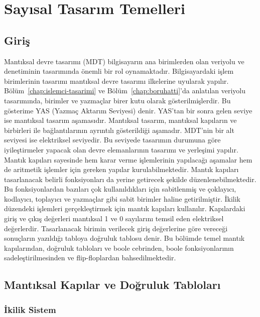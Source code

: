 \chapter{Sayısal Tasarım Temelleri}
\label{ch:sayisal-tasarim}

\section{Giriş}

Mantıksal devre tasarımı (MDT) bilgisayarın ana birimlerden olan veriyolu ve denetiminin tasarımında önemli bir rol oynamaktadır. Bilgisayardaki işlem birimlerinin tasarımı mantıksal devre tasarımı ilkelerine uyularak yapılır. Bölüm~\ref{chap:islemci-tasarimi} ve Bölüm~\ref{chap:boruhatti}'da anlatılan veriyolu tasarımında, birimler ve yazmaçlar birer kutu olarak gösterilmişlerdir. Bu gösterime YAS (Yazmaç Aktarım Seviyesi) denir. YAS'tan bir sonra gelen seviye ise mantıksal tasarım aşamasıdır. Mantıksal tasarım, mantıksal kapıların ve birbirleri ile bağlantılarının ayrıntılı gösterildiği aşamadır. MDT'nin bir alt seviyesi ise elektriksel seviyedir. Bu seviyede tasarımın durumuna göre iyileştirmeler yapacak olan devre elemanlarının tasarımı ve yerleşimi yapılır. Mantık kapıları sayesinde hem karar verme işlemlerinin yapılacağı aşamalar hem de aritmetik işlemler için gereken yapılar kurulabilmektedir. Mantık kapıları tasarlanacak belirli fonksiyonları da yerine getirecek şekilde düzenlenebilmektedir. Bu fonksiyonlardan bazıları çok kullanıldıkları için sabitlenmiş ve çoklayıcı, kodlayıcı, toplayıcı ve yazmaçlar gibi sabit birimler haline getirilmiştir. İkilik düzendeki işlemleri gerçekleştirmek için mantık kapıları kullanılır. Kapılardaki giriş ve çıkış değerleri mantıksal 1 ve 0 sayılarını temsil eden elektriksel değerlerdir. Tasarlanacak birimin verilecek giriş değerlerine göre vereceği sonuçların yazıldığı tabloya doğruluk tablosu denir. Bu bölümde temel mantık kapılarından, doğruluk tabloları ve boole cebrinden, boole fonksiyonlarının sadeleştirilmesinden ve flip-floplardan bahsedilmektedir.


\section{Mantıksal Kapılar ve Doğruluk Tabloları}

\subsection{İkilik Sistem}


